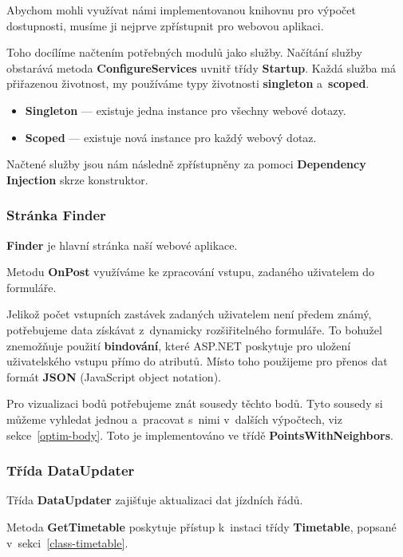 Abychom mohli využívat námi implementovanou knihovnu pro výpočet dostupnosti, musíme ji nejprve zpřístupnit pro webovou aplikaci.

Toho docílíme načtením potřebných modulů jako služby. Načítání služby obstarává metoda \textbf{ConfigureServices} uvnitř třídy \textbf{Startup}. Každá služba má přiřazenou životnost, my používáme typy životnosti \textbf{singleton} a~\textbf{scoped}.

\begin{itemize}
    \item \textbf{Singleton} --- existuje jedna instance pro všechny webové dotazy.
    \item \textbf{Scoped} --- existuje nová instance pro každý webový dotaz.
\end{itemize}

Načtené služby jsou nám následně zpřístupněny za pomoci \textbf{Dependency Injection} skrze konstruktor.

\subsubsection{Stránka Finder}

\textbf{Finder} je hlavní stránka naší webové aplikace.

Metodu \textbf{OnPost} využíváme ke zpracování vstupu, zadaného uživatelem do formuláře.

Jelikož počet vstupních zastávek zadaných uživatelem není předem známý, potřebujeme data získávat z~dynamicky rozšiřitelného formuláře. To bohužel znemožňuje použití \textbf{bindování}, které ASP.NET poskytuje pro uložení uživatelského vstupu přímo do atributů. Místo toho použijeme pro přenos dat formát \textbf{JSON} (JavaScript object notation).

Pro vizualizaci bodů potřebujeme znát sousedy těchto bodů. Tyto sousedy si můžeme vyhledat jednou a~pracovat s~nimi v~dalších výpočtech, viz sekce~\ref{optim-body}. Toto je implementováno ve třídě \textbf{PointsWithNeighbors}.

\subsubsection{Třída DataUpdater}\label{trida-DataUpdater}

Třída \textbf{DataUpdater} zajišťuje aktualizaci dat jízdních řádů.

Metoda \textbf{GetTimetable} poskytuje přístup k~instaci třídy \textbf{Timetable}, popsané v~sekci~\ref{class-timetable}.

